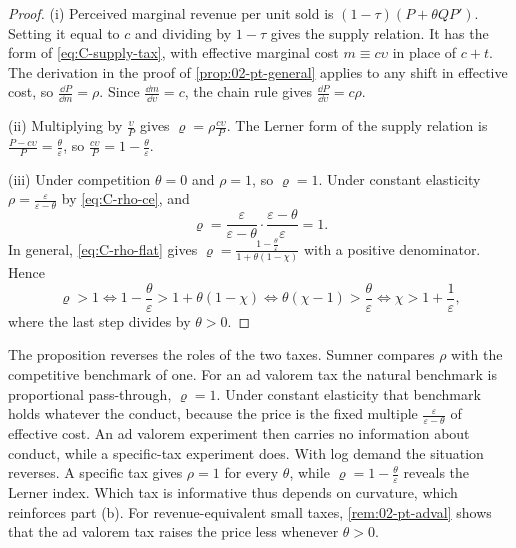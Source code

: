 \begin{proof}
(i) Perceived marginal revenue per unit sold is $(1 - \tau)(P + \theta QP')$. Setting it equal to $c$ and dividing by
$1 - \tau$ gives the supply relation. It has the form of \eqref{eq:C-supply-tax}, with effective marginal cost
$m \equiv c\upsilon$ in place of $c + t$. The derivation in the proof of \cref{prop:02-pt-general} applies to any shift
in effective cost, so $\frac{\dd P}{\dd m} = \rho$. Since $\frac{\dd m}{\dd\upsilon} = c$, the chain rule gives $\frac{\dd P}{\dd\upsilon} = c\rho$.

(ii) Multiplying by $\frac{\upsilon}{P}$ gives $\varrho = \rho\frac{c\upsilon}{P}$. The Lerner form of the supply relation
is $\frac{P - c\upsilon}{P} = \frac{\theta}{\varepsilon}$, so $\frac{c\upsilon}{P} = 1 - \frac{\theta}{\varepsilon}$.

(iii) Under competition $\theta = 0$ and $\rho = 1$, so $\varrho = 1$. Under constant elasticity
$\rho = \frac{\varepsilon}{\varepsilon - \theta}$ by \eqref{eq:C-rho-ce}, and
\begin{equation*}
\varrho = \frac{\varepsilon}{\varepsilon - \theta}\cdot\frac{\varepsilon - \theta}{\varepsilon} = 1 .
\end{equation*}
In general, \eqref{eq:C-rho-flat} gives $\varrho = \frac{1 - \frac{\theta}{\varepsilon}}{1 + \theta(1 - \chi)}$ with a
positive denominator. Hence
\begin{equation*}
\varrho > 1
\iff 1 - \frac{\theta}{\varepsilon} > 1 + \theta(1 - \chi)
\iff \theta(\chi - 1) > \frac{\theta}{\varepsilon}
\iff \chi > 1 + \frac{1}{\varepsilon} ,
\end{equation*}
where the last step divides by $\theta > 0$.
\end{proof}

The proposition reverses the roles of the two taxes. Sumner compares $\rho$ with the competitive benchmark of one.
For an ad valorem tax the natural benchmark is proportional pass-through, $\varrho = 1$. Under constant elasticity that
benchmark holds whatever the conduct, because the price is the fixed multiple $\frac{\varepsilon}{\varepsilon - \theta}$
of effective cost. An ad valorem experiment then carries no information about conduct, while a specific-tax
experiment does. With log demand the situation reverses. A specific tax gives $\rho = 1$ for every $\theta$, while
$\varrho = 1 - \frac{\theta}{\varepsilon}$ reveals the Lerner index. Which tax is informative thus depends on curvature,
which reinforces part (b). For revenue-equivalent small taxes, \cref{rem:02-pt-adval} shows that the ad valorem tax
raises the price less whenever $\theta > 0$.

